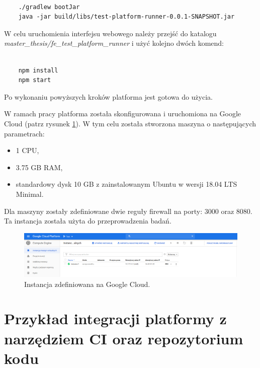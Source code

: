 {\selectfont
\tiny
\begin{lstlisting}

    ./gradlew bootJar
    java -jar build/libs/test-platform-runner-0.0.1-SNAPSHOT.jar

\end{lstlisting}
}

W celu uruchomienia interfejsu webowego należy przejść do katalogu \newline \textit{master\_thesis/fe\_test\_platform\_runner} i użyć kolejno dwóch komend:

{\selectfont
\tiny
\begin{lstlisting}

    npm install
    npm start

\end{lstlisting}
}

Po wykonaniu powyższych kroków platforma jest gotowa do użycia.

W ramach pracy platforma została skonfigurowana i uruchomiona na Google Cloud (patrz rysunek \ref{fig:google_cloud}).
W tym celu została stworzona maszyna o następujących parametrach:
\begin{itemize}
    \item 1 CPU,
    \item 3.75 GB RAM,
    \item standardowy dysk 10 GB z zainstalowanym Ubuntu w wersji 18.04 LTS Minimal.
\end{itemize}
Dla maszyny zostały zdefiniowane dwie reguły firewall na porty: 3000 oraz 8080.
Ta instancja została użyta do przeprowadzenia badań.

\begin{figure}[h]
    \centering
    \includegraphics[width = 12cm]{chapter05/google_cloud.png}
    \caption{Instancja zdefiniowana na Google Cloud.}
    \label{fig:google_cloud}
\end{figure}

\section {Przykład integracji platformy z narzędziem CI oraz repozytorium kodu}
\label{ci-integration}

